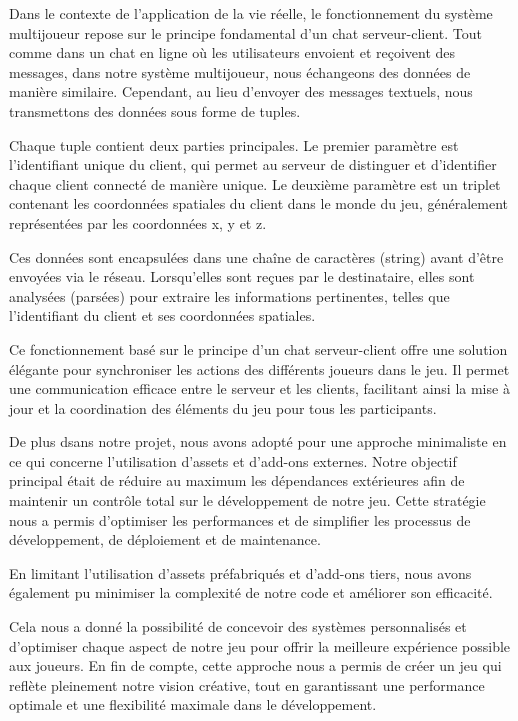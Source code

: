 \documentclass[
	article,			%
	11pt,				%
	oneside,			%
	a4paper,			%
	chapter=TITLE,
	french,			%
	sumario=tradicional
	]{base_nt}
\begin{document}
Dans le contexte de l'application de la vie réelle, le fonctionnement du système multijoueur repose sur le principe fondamental d'un chat serveur-client. Tout comme dans un chat en ligne où les utilisateurs envoient et reçoivent des messages, dans notre système multijoueur, nous échangeons des données de manière similaire. Cependant, au lieu d'envoyer des messages textuels, nous transmettons des données sous forme de tuples.

Chaque tuple contient deux parties principales. Le premier paramètre est l'identifiant unique du client, qui permet au serveur de distinguer et d'identifier chaque client connecté de manière unique. Le deuxième paramètre est un triplet contenant les coordonnées spatiales du client dans le monde du jeu, généralement représentées par les coordonnées x, y et z.

Ces données sont encapsulées dans une chaîne de caractères (string) avant d'être envoyées via le réseau. Lorsqu'elles sont reçues par le destinataire, elles sont analysées (parsées) pour extraire les informations pertinentes, telles que l'identifiant du client et ses coordonnées spatiales.

Ce fonctionnement basé sur le principe d'un chat serveur-client offre une solution élégante pour synchroniser les actions des différents joueurs dans le jeu. Il permet une communication efficace entre le serveur et les clients, facilitant ainsi la mise à jour et la coordination des éléments du jeu pour tous les participants.

\newpage

De plus dsans notre projet, nous avons adopté pour une approche minimaliste en ce qui concerne l'utilisation d'assets et d'add-ons externes. Notre objectif principal était de réduire au maximum les dépendances extérieures afin de maintenir un contrôle total sur le développement de notre jeu. Cette stratégie nous a permis d'optimiser les performances et de simplifier les processus de développement, de déploiement et de maintenance.

En limitant l'utilisation d'assets préfabriqués et d'add-ons tiers, nous avons également pu minimiser la complexité de notre code et améliorer son efficacité.

Cela nous a donné la possibilité de concevoir des systèmes personnalisés et d'optimiser chaque aspect de notre jeu pour offrir la meilleure expérience possible aux joueurs. En fin de compte, cette approche nous a permis de créer un jeu qui reflète pleinement notre vision créative, tout en garantissant une performance optimale et une flexibilité maximale dans le développement.
\end{document}
